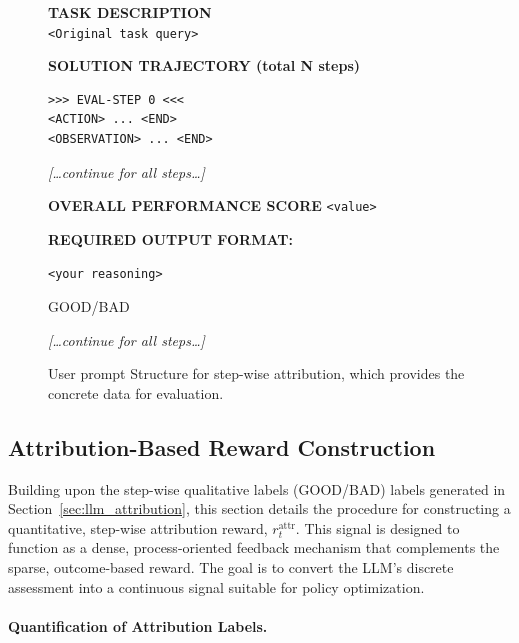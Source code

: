 \begin{figure}[htbp] 
\centering 
\begin{tcolorbox}[
  title=User Prompt for Step-wise Attribution,
  width=\linewidth, 
  boxrule=0.45mm,
  fonttitle=\bfseries,
  enhanced,
  sharp corners,
  colback=white,
  colframe=black!70,
]
\textbf{TASK DESCRIPTION} \\
\texttt{<Original task query>}

\vspace{2mm}
\textbf{SOLUTION TRAJECTORY (total N steps)}
\begin{verbatim}
>>> EVAL-STEP 0 <<<
<ACTION> ... <END>
<OBSERVATION> ... <END>
\end{verbatim}
\textit{[…continue for all steps…]}

\vspace{2mm}
\textbf{OVERALL PERFORMANCE SCORE} \texttt{<value>}

\vspace{2mm}
\textbf{REQUIRED OUTPUT FORMAT:}
\begin{description}[style=unboxed, leftmargin=0pt, itemsep=1pt]
    \item[Step 0 Analysis:] \texttt{<your reasoning>}
    \item[Step 0 Judgment:] GOOD/BAD
    
    \textit{[…continue for all steps…]}
\end{description}
\end{tcolorbox}

\caption{User prompt Structure for step-wise attribution, which provides the concrete data for evaluation.} 
\label{fig:attr_prompt_user}
\end{figure}



\subsection{Attribution-Based Reward Construction}
\label{sec:attribution_reward}
Building upon the step-wise qualitative labels (GOOD/BAD) labels generated in Section~\ref{sec:llm_attribution}, this section details the procedure for constructing a quantitative, step-wise attribution reward, $r_t^{\text{attr}}$. 
This signal is designed to function as a dense, process-oriented feedback mechanism that complements the sparse, outcome-based reward. The goal is to convert the LLM's discrete assessment into a continuous signal suitable for policy optimization.

\paragraph{Quantification of Attribution Labels.}

